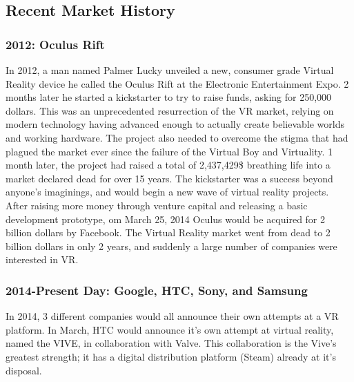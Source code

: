 \documentclass[a4paper,10pt,twoside]{article}
\begin{document}
\pagebreak

\subsection{Recent Market History}

\subsubsection{2012: Oculus Rift}

In 2012, a man named Palmer Lucky unveiled a new, consumer grade Virtual Reality device he called the Oculus Rift at the Electronic Entertainment Expo.  2 months later he started a kickstarter to try to raise funds, asking for 250,000 dollars.  This was an unprecedented resurrection of the VR market, relying on modern technology having advanced enough to actually create believable worlds and working hardware.  The project also needed to overcome the stigma that had plagued the market ever since the failure of the Virtual Boy and Virtuality.  1 month later, the project had raised a total of 2,437,429\$ breathing life into a market declared dead for over 15 years.  The kickstarter was a success beyond anyone's imaginings, and would begin a new wave of virtual reality projects.  After raising more money through venture capital and releasing a basic development prototype, om March 25, 2014 Oculus would be acquired for 2 billion dollars by Facebook.  The Virtual Reality market went from dead to 2 billion dollars in only 2 years, and suddenly a large number of companies were interested in VR.

\subsubsection{2014-Present Day: Google, HTC, Sony, and Samsung}

In 2014, 3 different companies would all announce their own attempts at a VR platform.  In March, HTC would announce it's own attempt at virtual reality, named the VIVE, in collaboration with Valve.  This collaboration is the Vive's greatest strength; it has a digital distribution platform (Steam) already at it's disposal.  
\end{document}
